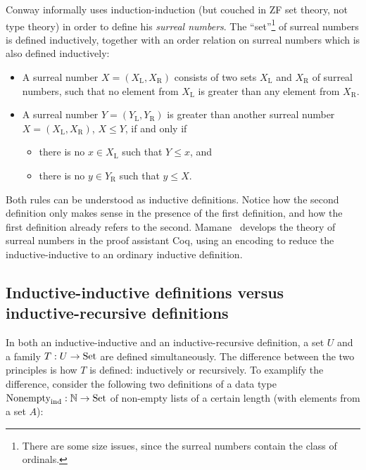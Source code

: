 \documentclass{article}
\begin{document}
\begin{example}
\label{ex:surreal}

Conway \cite{conway2001ONAG} informally uses induction-induction (but
couched in ZF set theory, not type theory) in order to define his
\emph{surreal numbers}. The ``set''\footnote{There are some size
  issues, since the surreal numbers contain the class of ordinals.} of
surreal numbers is defined inductively, together with an order
relation on surreal numbers which is also defined inductively:

\begin{itemize}
\item A surreal number $X = (X_\mathrm{L}, X_\mathrm{R})$ consists of
  two sets $X_\mathrm{L}$ and $X_\mathrm{R}$ of surreal numbers, such
  that no element from $X_\mathrm{L}$ is greater than any element from
  $X_\mathrm{R}$.
\item A surreal number $Y = (Y_\mathrm{L}, Y_\mathrm{R})$ is greater
  than another surreal number $X = (X_\mathrm{L}, X_\mathrm{R})$, $X \leq Y$, if and
  only if
  \begin{itemize}
  \item there is no $x \in X_\mathrm{L}$ such that $Y \leq x$, and
  \item there is no $y \in Y_\mathrm{R}$ such that $y \leq X$.
  \end{itemize}
\end{itemize}

Both rules can be understood as inductive definitions. Notice how the
second definition only makes sense in the presence of the first
definition, and how the first definition already refers to the second.
Mamane~\cite{mamane2004surrealCoq} develops the theory of surreal
numbers in the proof assistant Coq, using an encoding to reduce the
inductive-inductive to an ordinary inductive definition.
\blackqed
\end{example}


\subsection{Inductive-inductive definitions versus inductive-recursive definitions}
\label{sec:indind-vs-IR}


In both an inductive-inductive and an inductive-recursive definition,
a set $U$ and a family $T : U \to \text{Set}$ are defined
simultaneously. The difference between the two principles is how $T$
is defined: inductively or recursively. To examplify the difference,
consider the following two definitions of a data type $\text{Nonempty}_{\text{ind}} : \mathbb{N}
\to \text{Set}$ of non-empty lists of a certain length (with elements from a set $A$):
\end{document}
